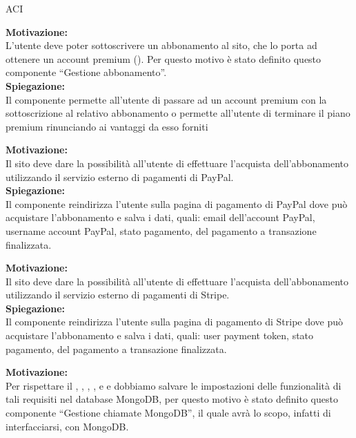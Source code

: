 \begin{listaPersonale}{ACI}

    \textbf{Motivazione:}\\
    L'utente deve poter sottoscrivere un abbonamento al sito, che lo porta ad ottenere un account premium (). Per questo motivo è stato definito questo componente “Gestione abbonamento”.\\
    \textbf{Spiegazione:}\\
    Il componente permette all'utente di passare ad un account premium con la sottoscrizione al relativo abbonamento o permette all'utente di terminare il piano premium rinunciando ai vantaggi da esso forniti



    \textbf{Motivazione:}\\
    Il sito deve dare la possibilità all'utente di effettuare l'acquista dell'abbonamento utilizzando il servizio esterno di pagamenti di PayPal.\\
    \textbf{Spiegazione:}\\
    Il componente reindirizza l'utente sulla pagina di pagamento di PayPal dove può acquistare l'abbonamento e salva i dati, quali: email dell'account PayPal, username account PayPal, stato pagamento, del pagamento a transazione finalizzata.


    \textbf{Motivazione:}\\
    Il sito deve dare la possibilità all'utente di effettuare l'acquista dell'abbonamento utilizzando il servizio esterno di pagamenti di Stripe.\\
    \textbf{Spiegazione:}\\
    Il componente reindirizza l'utente sulla pagina di pagamento di Stripe dove può acquistare l'abbonamento e salva i dati, quali: user payment token, stato pagamento, del pagamento a transazione finalizzata.



    \textbf{Motivazione:}\\
    Per rispettare il , , , ,  e  e  dobbiamo salvare le impostazioni delle funzionalità di tali requisiti nel database MongoDB, per questo motivo è stato definito questo componente “Gestione chiamate MongoDB”, il quale avrà lo scopo, infatti di interfacciarsi, con MongoDB.\\


\end{listaPersonale}
